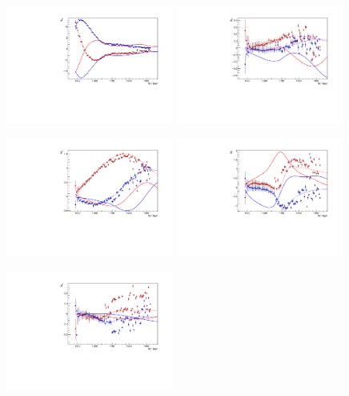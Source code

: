 \documentclass[a4paper,12pt]{report}
\begin{document}
\begin{figure}
  \begin{center}
    \centerline{
    \includegraphics[width=0.49\textwidth]{BnGa/Hedim/plots.0/E0p.pdf}
    \includegraphics[width=0.49\textwidth]{BnGa/Hedim/plots.0/E1p.pdf}
    }
    \centerline{
    \includegraphics[width=0.49\textwidth]{BnGa/Hedim/plots.0/M1p.pdf}
    \includegraphics[width=0.49\textwidth]{BnGa/Hedim/plots.0/M1m.pdf}
    }
    \centerline{
    \includegraphics[width=0.49\textwidth]{BnGa/Hedim/plots.0/E2p.pdf}
}
\end{center}
\end{figure}
\end{document}
